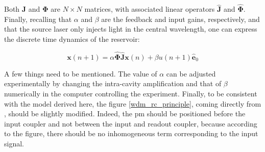Both $\mathbf{J}$ and $\mathbf{\Phi}$ are $N\times N$ matrices, with associated linear operators $\hat{\mathbf{J}}$ and $\hat{\mathbf{\Phi}}$. Finally, recalling that $\alpha$ and $\beta$ are the feedback and input gains, respectively, and that the source laser only injects light in the central wavelength, one can express the discrete time dynamics of the reservoir:

\begin{equation}
	\mathbf{x}(n+1) = \alpha \hat{\mathbf{\Phi}} \hat{\mathbf{J}} \mathbf{x}(n) + \beta u(n+1) \hat{\mathbf{e}}_0
	\label{model-reservoir}
\end{equation}

A few things need to be mentioned. The value of $\alpha$ can be adjusted experimentally by changing the intra-cavity amplification and that of $\beta$ numerically in the computer controlling the experiment. Finally, to be consistent with the model derived here, the figure \ref{wdm_rc_principle}, coming directly from \cite{AkroutAkram2016Pprc}, should be slightly modified. Indeed, the \gls{pm} should be positioned before the input coupler and not between the input and readout coupler, because according to the figure, there should be no inhomogeneous term corresponding to the input signal.

